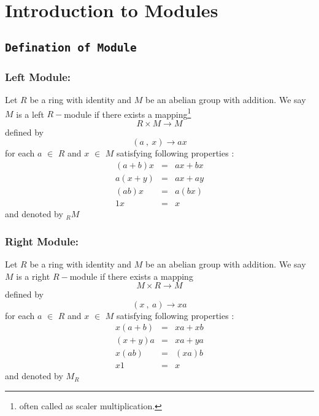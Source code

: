 \chapter{Introduction to Modules}
\section{\texttt{Defination of Module}}
\subsection{Left Module:}\label{sec:left-module}
 Let $ R $ be a ring with identity and $ M $ be an abelian group with addition. We say $ M $ is a left $R-$module if there exists a mapping\footnote{often called as scaler multiplication.}
\begin{equation*}
R \times M \rightarrow M
\end{equation*}	
defined by 
\begin{equation*}
(a \ , \ x) \rightarrow ax  
\end{equation*}
for each $a$ $\in$ $R$ and $x$ $\in$ $M$ satisfying following properties :
\begin{eqnarray*}
(a+b) x &=& ax + bx \\ a(x+y) &=& ax + ay \\ (ab)x &=& a(bx) \\ 1x &=& x
\end{eqnarray*}
and denoted by $_{R}M$
\subsection{Right Module:}\label{sec:right-module}
Let $ R $ be a ring with identity and $ M $ be an abelian group with addition. We say $ M $ is a right $R-$module if there exists a mapping
\begin{equation*}
M \times R \rightarrow M
\end{equation*}	
defined by 
\begin{equation*}
(x \ ,\ a) \rightarrow xa  
\end{equation*}
for each $a$ $\in$ $R$ and $x$ $\in$ $M$ satisfying following properties :
\begin{eqnarray*}
x (a+b)  &=& xa + xb \\ (x+y) a &=& xa + ya \\ x (ab) &=& (xa)b \\ x1 &=& x
\end{eqnarray*}
and denoted by $M_{R}$

